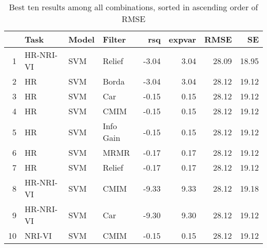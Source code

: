 \begin{table}[ht!]
\centering
\caption{Best ten results among all combinations, sorted in ascending order of RMSE} 
\label{tab:perf-top-10}
\begin{tabular}{rlllrrrr}
  \hline
 & Task & Model & Filter & rsq & expvar & RMSE & SE \\ 
  \hline
1 & HR-NRI-VI & SVM & Relief & -3.04 & 3.04 & 28.09 & 18.95 \\ 
  2 & HR & SVM & Borda & -3.04 & 3.04 & 28.12 & 19.12 \\ 
  3 & HR & SVM & Car & -0.15 & 0.15 & 28.12 & 19.12 \\ 
  4 & HR & SVM & CMIM & -0.15 & 0.15 & 28.12 & 19.12 \\ 
  5 & HR & SVM & Info Gain & -0.15 & 0.15 & 28.12 & 19.12 \\ 
  6 & HR & SVM & MRMR & -0.17 & 0.17 & 28.12 & 19.12 \\ 
  7 & HR & SVM & Relief & -0.17 & 0.17 & 28.12 & 19.12 \\ 
  8 & HR-NRI-VI & SVM & CMIM & -9.33 & 9.33 & 28.12 & 19.18 \\ 
  9 & HR-NRI-VI & SVM & Car & -9.30 & 9.30 & 28.12 & 19.12 \\ 
  10 & NRI-VI & SVM & CMIM & -0.15 & 0.15 & 28.12 & 19.12 \\ 
   \hline
\end{tabular}
\end{table}
